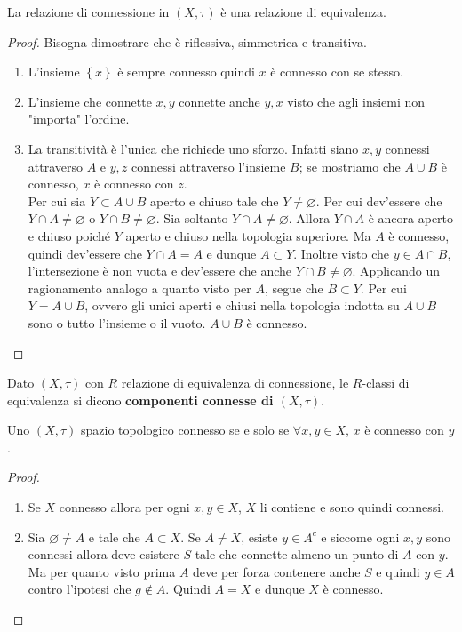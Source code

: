 \begin{lemma}
	La relazione di connessione in $(X, \tau)$ è una relazione di equivalenza. 
\end{lemma} 
\begin{proof}
	Bisogna dimostrare che è riflessiva, simmetrica e transitiva.
	\begin{enumerate}
		\item	L'insieme $\left\{x\right\}$ è sempre connesso quindi $x$ è connesso con se stesso.
		\item L'insieme che connette $x,y$ connette anche $y,x$ visto che agli insiemi non "importa" l'ordine.
		\item La transitività è l'unica che richiede uno sforzo. Infatti siano $x,y$ connessi attraverso $A$ e $y,z$ connessi attraverso l'insieme $B$; se mostriamo che $A \cup B$ è connesso, $x$ è connesso con $z$. \\ Per cui sia $Y \subset A \cup B$ aperto e chiuso tale che $Y \neq \varnothing$. Per cui dev'essere che $Y \cap A \neq \varnothing$ o $Y \cap B \neq \varnothing$. Sia soltanto $Y \cap A \neq \varnothing$. Allora $Y \cap A$ è ancora aperto e chiuso poiché $Y$ aperto e chiuso nella topologia superiore. Ma $A$ è connesso, quindi dev'essere che $Y \cap A = A$ e dunque $A \subset Y$. Inoltre visto che $y\in A \cap B$, l'intersezione è non vuota e dev'essere che anche $Y \cap B \neq \varnothing$. Applicando un ragionamento analogo a quanto visto per $A$, segue che $B \subset Y$. Per cui $Y = A \cup B$, ovvero gli unici aperti e chiusi nella topologia indotta su $A \cup B$ sono o tutto l'insieme o il vuoto. $A \cup B$ è connesso.
	\end{enumerate}
\end{proof}

\begin{definition}
	Dato $(X, \tau)$ con $R$ relazione di equivalenza di connessione, le $R$-classi di equivalenza si dicono \textbf{componenti connesse di $(X, \tau)$}.
\end{definition} 

\begin{theorem}
	\label{thr:3.21.4}
	Uno $(X, \tau)$ spazio topologico connesso se e solo se $\forall x, y \in X$, $x$ è connesso con $y$.
\end{theorem} 
\begin{proof} \
	\begin{enumerate}
		\item Se $X$ connesso allora per ogni $x, y \in X$, $X$ li contiene e sono quindi connessi. 
		\item Sia $\varnothing \neq A$ e tale che $A \subset X$. Se $A \neq X$, esiste $y \in A^c$ e siccome ogni $x, y$ sono connessi allora deve esistere $S$ tale che connette almeno un punto di $A$ con $y$. Ma per quanto visto prima $A$ deve per forza contenere anche $S$ e quindi $y \in A$ contro l'ipotesi che $g \notin A$. Quindi $A = X$ e dunque $X$ è connesso. 
	\end{enumerate}
\end{proof}

